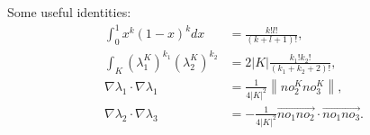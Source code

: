 \documentclass[11pt,a4paper,center,notitlepage]{article}
\numberwithin{equation}{section}
\begin{document}
Some useful identities:
\begin{align}
\int_0^1 {{x^k}{{\left( {1 - x} \right)}^k}dx}  &= \frac{{k!l!}}{{\left( {k + l + 1} \right)!}},\\
\int_K {{{\left( {\lambda _1^K} \right)}^{{k_1}}}{{\left( {\lambda _2^K} \right)}^{{k_2}}}}  &= 2\left| K \right|\frac{{{k_1}!{k_2}!}}{{\left( {{k_1} + {k_2} + 2} \right)!}},\\
\nabla {\lambda _1} \cdot \nabla {\lambda _1} &= \frac{1}{{4{{\left| K \right|}^2}}}\left\| {no_2^Kno_3^K} \right\|,\\
\nabla {\lambda _2} \cdot \nabla {\lambda _3} &=  - \frac{1}{{4{{\left| K \right|}^2}}}\overrightarrow {n{o_1}n{o_2}}  \cdot \overrightarrow {n{o_1}n{o_3}} .
\end{align}



\printbibliography
%
%
\end{document}

